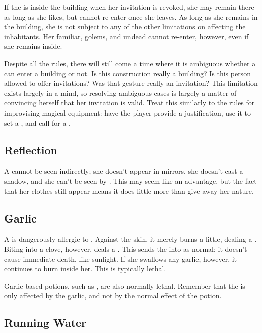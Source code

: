 If the {\vampire} is inside the building when her invitation is revoked, she may remain there as long as she likes, but cannot re-enter once she leaves.
As long as she remains in the building, she is not subject to any of the other limitations on affecting the inhabitants.
Her familiar, golems, and undead cannot re-enter, however, even if she remains inside.

Despite all the rules, there will still come a time where it is ambiguous whether a {\vampire} can enter a building or not.
Is this construction really a building?
Is this person allowed to offer invitations?
Was that gesture really an invitation?
This limitation exists largely in a {\vampirepossessive} mind, so resolving ambiguous cases is largely a matter of convincing herself that her invitation is valid.
Treat this similarly to the rules for improvising magical equipment: have the player provide a justification, use it to set a {\tn}, and call for a  {\test}.

\subsection{Reflection}

A {\vampire} cannot be seen indirectly; she doesn't appear in mirrors, she doesn't cast a shadow, and she can't be seen by .
This may seem like an advantage, but the fact that her clothes still appear means it does little more than give away her {\vampiric} nature.

\subsection{Garlic}

A {\vampire} is dangerously allergic to .
Against the skin, it merely burns a little, dealing a  {\damagetest}.
Biting into a clove, however, deals a  {\damagetest}.
This {\damagetest} sends the {\vampire} into {\shock} as normal; it doesn't cause immediate death, like sunlight.
If she swallows any garlic, however, it continues to burn inside her.
This is typically lethal.

Garlic-based potions, such as , are also normally lethal.
Remember that the {\vampire} is only affected by the garlic, and not by the normal effect of the potion.

\subsection{Running Water}


